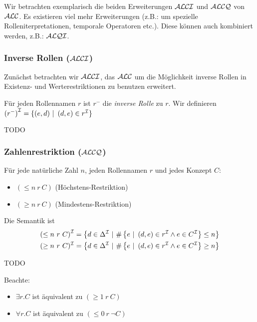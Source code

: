 Wir betrachten exemplarisch die beiden Erweiterungen $\mathcal{A}\mathcal{L}\mathcal{C}\mathcal{I}$ und $\mathcal{A}\mathcal{L}\mathcal{C}\mathcal{Q}$ von $\mathcal{A}\mathcal{L}\mathcal{C}$. Es existieren viel mehr Erweiterungen (z.B.: um spezielle Rolleniterpretationen, temporale Operatoren etc.). Diese können auch kombiniert werden, z.B.: $\mathcal{A}\mathcal{L}\mathcal{Q}\mathcal{I}$.

\subsubsection{Inverse Rollen (\texorpdfstring{$\mathcal{A}\mathcal{L}\mathcal{C}\mathcal{I}$}{ALCI})}\label{inverse-rollen-alci}

Zunächst betrachten wir $\mathcal{A}\mathcal{L}\mathcal{C}\mathcal{I}$, das $\mathcal{A}\mathcal{L}\mathcal{C}$ um die Möglichkeit inverse Rollen in Existenz- und Werterestriktionen zu benutzen erweitert.

\begin{definition}
Für jeden Rollennamen $r$ ist $r^{-}$ die \emph{inverse
Rolle} zu $r$. Wir definieren
$\left( r^{-} \right)^{\mathcal{I}} = \left\{ \left( e,d \right)\  \right|\ \left( d,e \right) \in r^{\mathcal{I}}\}$
\end{definition}

\begin{tafel}
    TODO
\end{tafel}

\subsubsection{Zahlenrestriktion (\texorpdfstring{$\mathcal{A}\mathcal{L}\mathcal{C}\mathcal{Q}$}{ALCQ})}\label{zahlenrestriktion-alcq}

\begin{definition}[Zahlenrestriktion]
Für jede natürliche Zahl $n$, jeden Rollennamen $r$ und
jedes Konzept $C$:

\begin{itemize}
  \item $\left( \leq n\ r\ C \right)$ (Höchstens-Restriktion)
  \item $\left( \geq n\ r\ C \right)$ (Mindestens-Restriktion)
\end{itemize}

Die Semantik ist \begin{align*}
    \left( \leq n\ r\ C \right)^{\MI} &= \left\{ d \in \Delta^{\MI}\ |\ \#\left\{ e\ |\ \left( d,e \right) \in r^{\MI} \land e \in C^{\MI} \right\} \leq n \right\}\\
    ( \geq n\ r\ C)^\MI &= \left\{ d \in \Delta^{\MI}\ |\ \#\left\{ e\ |\ \left( d,e \right) \in r^{\MI} \land e \in C^{\MI} \right\} \geq n \right\}
\end{align*}
\end{definition}

\begin{tafel}
    TODO
\end{tafel}

Beachte:

\begin{itemize}
  \item $\exists r.C$ ist äquivalent zu $(\geq 1\ r\ C)$
  \item $\forall r.C$ ist äquivalent zu $(\leq 0\ r\ \neg C)$
\end{itemize}
